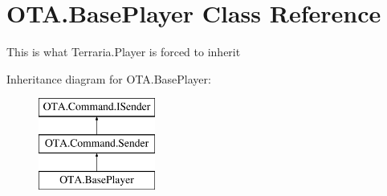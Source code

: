 \hypertarget{class_o_t_a_1_1_base_player}{}\section{O\+T\+A.\+Base\+Player Class Reference}
\label{class_o_t_a_1_1_base_player}


This is what Terraria.\+Player is forced to inherit  


Inheritance diagram for O\+T\+A.\+Base\+Player\+:\begin{figure}[H]
\begin{center}
\leavevmode
\includegraphics[height=3.000000cm]{class_o_t_a_1_1_base_player}
\end{center}
\end{figure}
